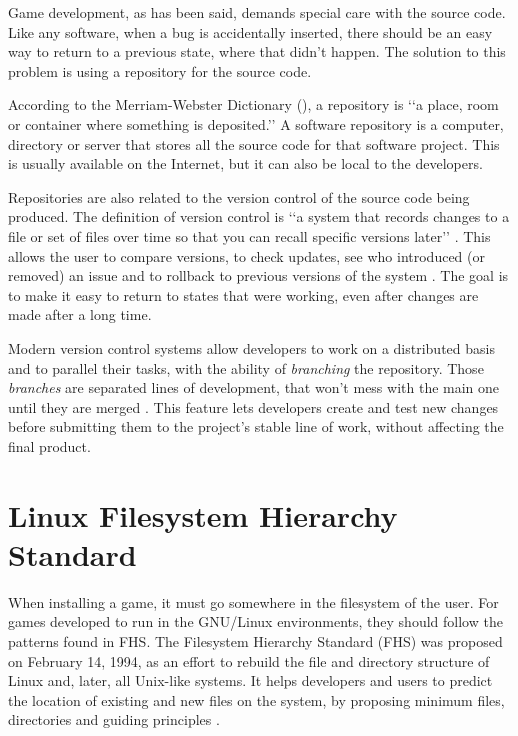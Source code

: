 Game development, as has been said, demands special care with the source code. Like any software, when a bug is accidentally inserted, there should be an easy way to return to a previous state, where that didn't happen. The solution to this problem is using a repository for the source code.

According to the Merriam-Webster Dictionary (\citeyear{webster2017repository}), a repository is \lq\lq a place, room or container where something is deposited.\rq\rq{} A software repository is a computer, directory or server that stores all the source code for that software project. This is usually available on the Internet, but it can also be local to the developers.

Repositories are also related to the version control of the source code being produced. The definition of version control is \lq\lq a system that records changes to a file or set of files over time so that you can recall specific versions later\rq\rq{} \cite{loeliger2012version}. This allows the user to compare versions, to check updates, see who introduced (or removed) an issue and to rollback to previous versions of the system \cite{chacon2014pro}. The goal is to make it easy to return to states that were working, even after changes are made after a long time.

Modern version control systems allow developers to work on a distributed basis and to parallel their tasks, with the ability of \textit{branching} the repository. Those \textit{branches} are separated lines of development, that won't mess with the main one until they are merged \cite{westby2015git}. This feature lets developers create and test new changes before submitting them to the project's stable line of work, without affecting the final product.

\section{Linux Filesystem Hierarchy Standard}
\label {sec:fhs}

When installing a game, it must go somewhere in the filesystem of the user. For games developed to run in the GNU/Linux environments, they should follow the patterns found in FHS. The Filesystem Hierarchy Standard (FHS) was proposed on February 14, 1994, as an effort to rebuild the file and directory structure of Linux and, later, all Unix-like systems. It helps developers and users to predict the location of existing and new files on the system, by proposing minimum files, directories and guiding principles \cite{bandel2001special}.

